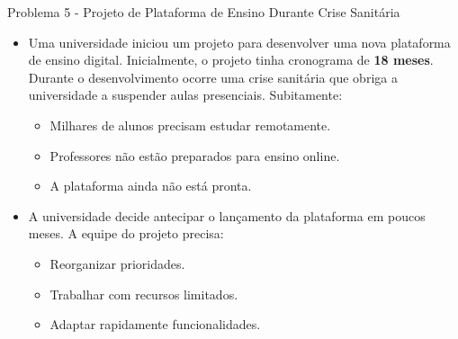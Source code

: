 \documentclass{beamer}
\begin{document}
\begin{frame}{Problema 5 - Projeto de Plataforma de Ensino Durante Crise Sanitária}
	\begin{itemize}
		\justifying
		\item Uma universidade iniciou um projeto para desenvolver uma nova plataforma de ensino digital. Inicialmente, o projeto tinha cronograma de \textbf{18 meses}. Durante o desenvolvimento ocorre uma crise sanitária que obriga a universidade a suspender aulas presenciais. Subitamente:
			\begin{itemize}
				\justifying
				\item Milhares de alunos precisam estudar remotamente.
				\item Professores não estão preparados para ensino online.
				\item A plataforma ainda não está pronta.
			\end{itemize}
		\item A universidade decide antecipar o lançamento da plataforma em poucos meses. A equipe do projeto precisa:
			\begin{itemize}
				\justifying
				\item Reorganizar prioridades.
				\item Trabalhar com recursos limitados.
				\item Adaptar rapidamente funcionalidades.
			\end{itemize}
	\end{itemize}
\end{frame}
\end{document}
